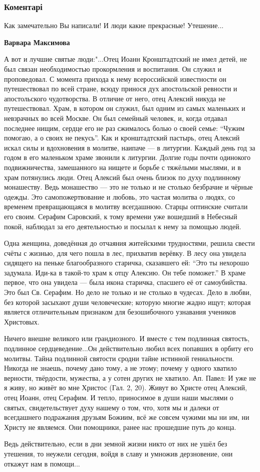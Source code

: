 \subsubsection{Коментарі}
\begin{itemize}
Как замечательно Вы написали! И люди какие прекрасные! Утешение...

\textbf{Варвара Максимова} 

А вот и лучшие святые люди:"...Отец Иоанн Кронштадтский не имел детей, не был
связан необходимостью прокормления и воспитания. Он служил и проповедовал. С
момента прихода к нему всероссийской известности он путешествовал по всей
стране, всюду принося дух апостольской ревности и апостольского чудотворства. В
отличие от него, отец Алексий никуда не путешествовал. Храм, в котором он
служил, был одним из самых маленьких и невзрачных во всей Москве. Он был
семейный человек, и, когда отдавал последнее нищим, сердце его не раз сжималось
болью о своей семье: \enquote{Чужим помогаю, а о своих не пекусь}. Как и кронштадтский
пастырь, отец Алексий искал силы и вдохновения в молитве, наипаче — в литургии.
Каждый день год за годом в его маленьком храме звонили к литургии. Долгие годы
почти одинокого подвижничества, замешанного на нищете и борьбе с тяжёлыми
мыслями, и в храм потянулись люди. Отец Алексий был очень близок по духу
подлинному монашеству. Ведь монашество — это не только и не столько безбрачие и
чёрные одежды. Это самопожертвование и любовь, это частая молитва о людях, со
временем превращающаяся в молитву всегдашнюю. Старцы оптинские считали его
своим. Серафим Саровский, к тому времени уже вошедший в Небесный покой,
наблюдал за его деятельностью и посылал к нему за помощью людей.

Одна женщина, доведённая до отчаяния житейскими трудностями, решила свести
счёты с жизнью, для чего пошла в лес, прихватив верёвку. В лесу она увидела
сидящего на пеньке благообразного старичка, сказавшего ей: \enquote{Это ты нехорошо
задумала. Иди-ка в такой-то храм к отцу Алексию. Он тебе поможет.} В храме
первое, что она увидела — была икона старичка, спасшего её от самоубийства. Это
был Св. Серафим. Но дело не только и не столько в чудесах. Дело в любви, без
которой засыхают души человеческие; которую многие жадно ищут; которая является
отличительным признаком для безошибочного узнавания учеников Христовых.

Ничего внешне великого или грандиозного. И вместе с тем подлинная святость,
подлинное сердцеведение...Он действительно любил всех попавших в орбиту его
молитвы. Тайна подлинной святости сродни тайне истинной гениальности. Никогда
не знаешь, почему дано тому, а не этому; почему у одного хватило верности,
твёрдости, мужества, а у сотен других не хватило. Ап. Павел: И уже не я живу,
но живёт во мне Христос (Гал. 2, 20). Живут во Христе отец Алексий, отец Иоанн,
отец Серафим. И тепло, приносимое в души наши мыслями о святых, свидетельствует
духу нашему о том, что, хотя мы и далеки от всегдашнего подражания друзьям
Божиим, всё же совсем чужими мы ни им, ни Христу не являемся. Они помощники,
ранее нас прошедшие путь до конца.

Ведь действительно, если в дни земной жизни никто от них не ушёл без утешения,
то неужели сегодня, войдя в славу и умножив дерзновение, они откажут нам в
помощи...


\end{itemize}
